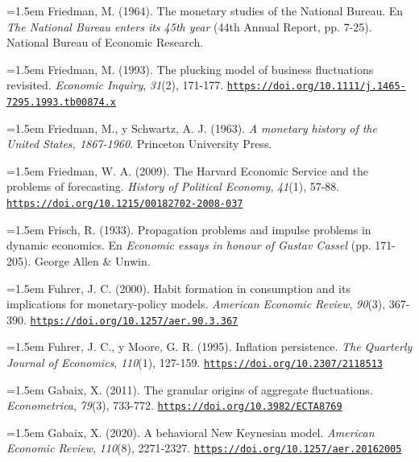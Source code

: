 \documentclass[10pt,a4paper]{article}
\begin{document}
\noindent\hangindent=1.5em Friedman, M. (1964). The monetary studies of the National Bureau. En \textit{The National Bureau enters its 45th year} (44th Annual Report, pp. 7-25). National Bureau of Economic Research.

\noindent\hangindent=1.5em Friedman, M. (1993). The plucking model of business fluctuations revisited. \textit{Economic Inquiry}, \textit{31}(2), 171-177. \href{https://doi.org/10.1111/j.1465-7295.1993.tb00874.x}{\nolinkurl{https://doi.org/10.1111/j.1465-7295.1993.tb00874.x}}

\noindent\hangindent=1.5em Friedman, M., y Schwartz, A. J. (1963). \textit{A monetary history of the United States, 1867-1960}. Princeton University Press.

{\sloppy\noindent\hangindent=1.5em Friedman, W. A. (2009). The Harvard Economic Service and the problems of forecasting. \textit{History of Political Economy}, \textit{41}(1), 57-88. \href{https://doi.org/10.1215/00182702-2008-037}{\nolinkurl{https://doi.org/10.1215/00182702-2008-037}}\par}

\noindent\hangindent=1.5em Frisch, R. (1933). Propagation problems and impulse problems in dynamic economics. En \textit{Economic essays in honour of Gustav Cassel} (pp. 171-205). George Allen \& Unwin.

\noindent\hangindent=1.5em Fuhrer, J. C. (2000). Habit formation in consumption and its implications for monetary-policy models. \textit{American Economic Review}, \textit{90}(3), 367-390. \href{https://doi.org/10.1257/aer.90.3.367}{\nolinkurl{https://doi.org/10.1257/aer.90.3.367}}

\noindent\hangindent=1.5em Fuhrer, J. C., y Moore, G. R. (1995). Inflation persistence. \textit{The Quarterly Journal of Economics}, \textit{110}(1), 127-159. \href{https://doi.org/10.2307/2118513}{\nolinkurl{https://doi.org/10.2307/2118513}}

\noindent\hangindent=1.5em Gabaix, X. (2011). The granular origins of aggregate fluctuations. \textit{Econometrica}, \textit{79}(3), 733-772. \href{https://doi.org/10.3982/ECTA8769}{\nolinkurl{https://doi.org/10.3982/ECTA8769}}

\noindent\hangindent=1.5em Gabaix, X. (2020). A behavioral New Keynesian model. \textit{American Economic Review}, \textit{110}(8), 2271-2327. \href{https://doi.org/10.1257/aer.20162005}{\nolinkurl{https://doi.org/10.1257/aer.20162005}}
\end{document}
